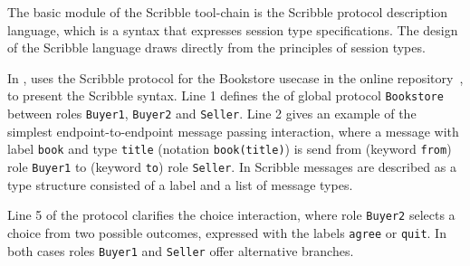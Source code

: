 The basic module of the Scribble tool-chain is the
Scribble protocol description language,
which is a syntax that expresses session type specifications.
The design of the Scribble language draws directly from
the principles of session types.



In , uses the Scribble protocol for the
Bookstore usecase in the online repository~\cite{usecase_repository},
to present the Scribble syntax.
Line 1 defines the 
of global protocol \lstinline|Bookstore| between
roles \lstinline|Buyer1|, \lstinline|Buyer2| and \lstinline|Seller|.
Line 2 gives an example of the simplest endpoint-to-endpoint
message passing interaction,
where a message with
label \lstinline|book| and type \lstinline|title| (notation \lstinline|book(title)|)
is send from (keyword \lstinline|from|) role \lstinline|Buyer1| to (keyword \lstinline|to|)
role \lstinline{Seller}.
In Scribble messages are described as a type structure
consisted of a label and a list of message types.


Line 5 of the protocol clarifies the choice interaction, where
role \lstinline|Buyer2| selects a choice from two possible outcomes,
expressed with the labels \lstinline|agree| or \lstinline|quit|. In 
both cases roles \lstinline|Buyer1| and \lstinline|Seller| offer
alternative branches.









\begin{comment}
For example Scribble code:
%
\begin{lstlisting}
  msg(int) from A to B;
\end{lstlisting}
%
describes the global protocol between role \lstinline|A| and \lstinline|B|,
where participant \lstinline|A| sends message of type \lstinline|msg(int)|
to participant \lstinline|B|. From the local perspective of participant
\lstinline|A| the protocol would be:
%
\begin{lstlisting}
  msg(int) to B;
\end{lstlisting}
%
where it describes the sending of message \lstinline|msg(int)|
to participant \lstinline|B|.
\end{comment}



